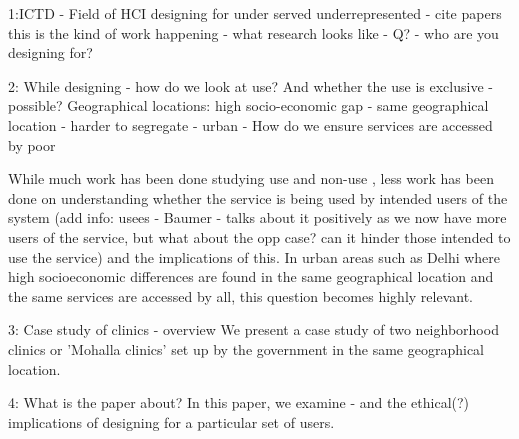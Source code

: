 1:ICTD - Field of HCI designing for under served underrepresented - cite papers this is the kind of work happening - what research looks like - Q? - who are you designing for?

2: While designing - how do we look at use? And whether the use is exclusive - possible? 
Geographical locations: high socio-economic gap - same geographical location - harder to segregate - urban - How do we ensure services are accessed by poor

While much work has been done studying use and non-use \cite{}, less work has been done on understanding whether the service is being used by intended users of the system (add info: usees - Baumer - talks about it positively as we now have more users of the service, but what about the opp case? can it hinder those intended to use the service) and the implications of this. In urban areas such as Delhi where high socioeconomic differences are found in the same geographical location and the same services are accessed by all, this question becomes highly relevant.

3: Case study of clinics - overview
We present a case study of two neighborhood clinics or 'Mohalla clinics' set up by the government in the same geographical location. 

4: What is the paper about?
In this paper, we examine - and the ethical(?) implications of designing for a particular set of users.
